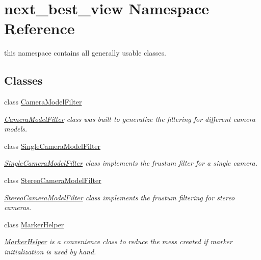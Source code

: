 \hypertarget{namespacenext__best__view}{\section{next\-\_\-best\-\_\-view \-Namespace \-Reference}
\label{namespacenext__best__view}
}


this namespace contains all generally usable classes.  


\subsection*{\-Classes}
\begin{DoxyCompactItemize}
\item 
class \hyperlink{classnext__best__view_1_1CameraModelFilter}{\-Camera\-Model\-Filter}
\begin{DoxyCompactList}\small\item\em \hyperlink{classnext__best__view_1_1CameraModelFilter}{\-Camera\-Model\-Filter} class was built to generalize the filtering for different camera models. \end{DoxyCompactList}\item 
class \hyperlink{classnext__best__view_1_1SingleCameraModelFilter}{\-Single\-Camera\-Model\-Filter}
\begin{DoxyCompactList}\small\item\em \hyperlink{classnext__best__view_1_1SingleCameraModelFilter}{\-Single\-Camera\-Model\-Filter} class implements the frustum filter for a single camera. \end{DoxyCompactList}\item 
class \hyperlink{classnext__best__view_1_1StereoCameraModelFilter}{\-Stereo\-Camera\-Model\-Filter}
\begin{DoxyCompactList}\small\item\em \hyperlink{classnext__best__view_1_1StereoCameraModelFilter}{\-Stereo\-Camera\-Model\-Filter} class implements the frustum filtering for stereo cameras. \end{DoxyCompactList}\item 
class \hyperlink{classnext__best__view_1_1MarkerHelper}{\-Marker\-Helper}
\begin{DoxyCompactList}\small\item\em \hyperlink{classnext__best__view_1_1MarkerHelper}{\-Marker\-Helper} is a convenience class to reduce the mess created if marker initialization is used by hand. \end{DoxyCompactList}\item 

\end{DoxyCompactItemize}
